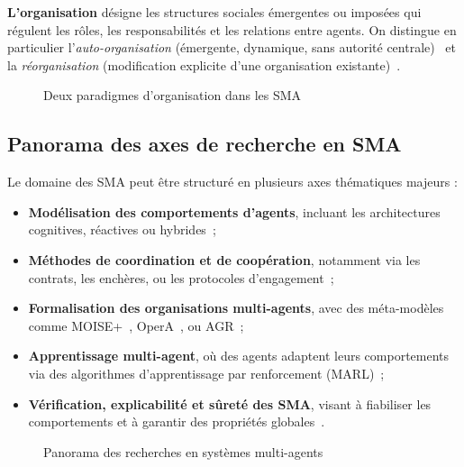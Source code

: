 \documentclass[ twoside,openright,titlepage,numbers=noenddot,headinclude,%
                footinclude=true,cleardoublepage=empty,abstractoff, %
                BCOR=5mm,paper=a4,fontsize=11pt,%
                french,american,%
                ]{scrreprt}
\begin{document}
\textbf{L'organisation} désigne les structures sociales émergentes ou imposées qui régulent les rôles, les responsabilités et les relations entre agents. On distingue en particulier l'\emph{auto-organisation} (émergente, dynamique, sans autorité centrale)~\cite{Heylighen2001, DiMarzoSerugendo2005} et la \emph{réorganisation} (modification explicite d'une organisation existante)~\cite{Picard2003, Chehbi2020}.

\begin{figure}[h]
    \centering
    \caption{Deux paradigmes d'organisation dans les SMA}
    \label{fig:auto_vs_topdown}
\end{figure}

\subsection*{Panorama des axes de recherche en SMA}

Le domaine des SMA peut être structuré en plusieurs axes thématiques majeurs :

\begin{itemize}
    \item \textbf{Modélisation des comportements d'agents}, incluant les architectures cognitives, réactives ou hybrides~\cite{Georgeff1999};
    \item \textbf{Méthodes de coordination et de coopération}, notamment via les contrats, les enchères, ou les protocoles d'engagement~\cite{Sandholm1999};
    \item \textbf{Formalisation des organisations multi-agents}, avec des méta-modèles comme MOISE+~\cite{Hannoun2000, Hübner2002}, OperA~\cite{Dignum2004}, ou AGR~\cite{Ferber2003};
    \item \textbf{Apprentissage multi-agent}, où des agents adaptent leurs comportements via des algorithmes d'apprentissage par renforcement (MARL)~\cite{Zhang2021};
    \item \textbf{Vérification, explicabilité et sûreté des SMA}, visant à fiabiliser les comportements et à garantir des propriétés globales~\cite{Boella2008, Dennis2012}.
\end{itemize}

\begin{figure}[h]
    \centering
    \caption{Panorama des recherches en systèmes multi-agents}
    \label{fig:panorama_sma}
\end{figure}
\end{document}
